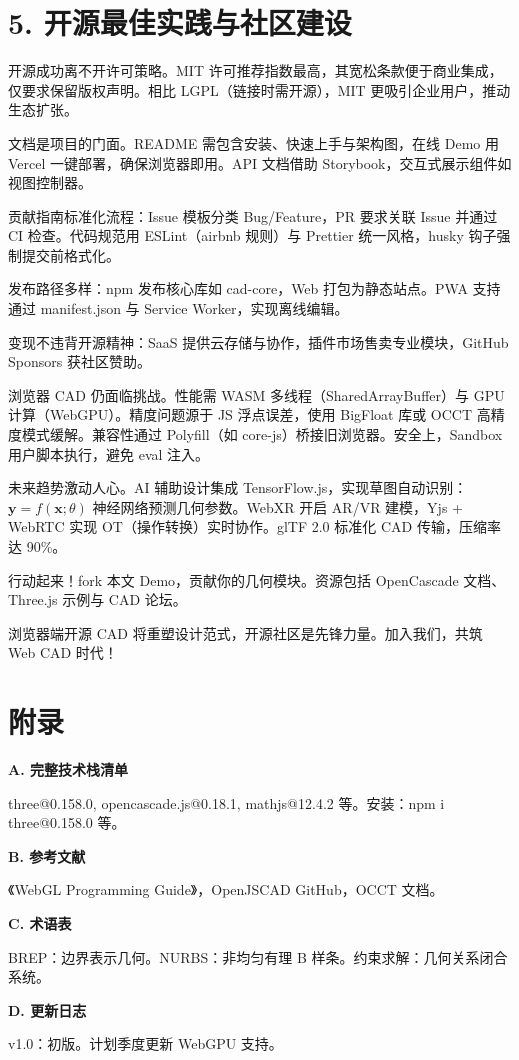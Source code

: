 \chapter{5. 开源最佳实践与社区建设}
开源成功离不开许可策略。MIT 许可推荐指数最高，其宽松条款便于商业集成，仅要求保留版权声明。相比 LGPL（链接时需开源），MIT 更吸引企业用户，推动生态扩张。\par
文档是项目的门面。README 需包含安装、快速上手与架构图，在线 Demo 用 Vercel 一键部署，确保浏览器即用。API 文档借助 Storybook，交互式展示组件如视图控制器。\par
贡献指南标准化流程：Issue 模板分类 Bug/Feature，PR 要求关联 Issue 并通过 CI 检查。代码规范用 ESLint（airbnb 规则）与 Prettier 统一风格，husky 钩子强制提交前格式化。\par
发布路径多样：npm 发布核心库如 cad-core，Web 打包为静态站点。PWA 支持通过 manifest.json 与 Service Worker，实现离线编辑。\par
变现不违背开源精神：SaaS 提供云存储与协作，插件市场售卖专业模块，GitHub Sponsors 获社区赞助。\par
浏览器 CAD 仍面临挑战。性能需 WASM 多线程（SharedArrayBuffer）与 GPU 计算（WebGPU）。精度问题源于 JS 浮点误差，使用 BigFloat 库或 OCCT 高精度模式缓解。兼容性通过 Polyfill（如 core-js）桥接旧浏览器。安全上，Sandbox 用户脚本执行，避免 eval 注入。\par
未来趋势激动人心。AI 辅助设计集成 TensorFlow.js，实现草图自动识别：$\mathbf{y} = f(\mathbf{x}; \theta)$ 神经网络预测几何参数。WebXR 开启 AR/VR 建模，Yjs + WebRTC 实现 OT（操作转换）实时协作。glTF 2.0 标准化 CAD 传输，压缩率达 90\%{}。\par
行动起来！fork 本文 Demo，贡献你的几何模块。资源包括 OpenCascade 文档、Three.js 示例与 CAD 论坛。\par
浏览器端开源 CAD 将重塑设计范式，开源社区是先锋力量。加入我们，共筑 Web CAD 时代！\par
\chapter{附录}
\textbf{A. 完整技术栈清单}\par
three@0.158.0, opencascade.js@0.18.1, mathjs@12.4.2 等。安装：npm i three@0.158.0 等。\par
\textbf{B. 参考文献}\par
《WebGL Programming Guide》，OpenJSCAD GitHub，OCCT 文档。\par
\textbf{C. 术语表}\par
BREP：边界表示几何。NURBS：非均匀有理 B 样条。约束求解：几何关系闭合系统。\par
\textbf{D. 更新日志}\par
v1.0：初版。计划季度更新 WebGPU 支持。\par

